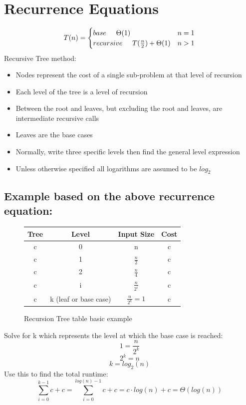 \documentclass[12pt,letterpaper]{article}
\begin{document}
\section{Recurrence Equations}
\[T(n)=\begin{cases}base \hspace{.5cm} \Theta(1) & n=1 \\ recursive \hspace{.5cm} T(\frac{n}{2})+\Theta(1) & n>1\end{cases}\]
Recursive Tree method:
\begin{itemize}
\item Nodes represent the cost of a single sub-problem at that level of recursion
\item Each level of the tree is a level of recursion
\item Between the root and leaves, but excluding the root and leaves, are intermediate recursive calls
\item Leaves are the base cases
\item Normally, write three specific levels then find the general level expression
\item Unless otherwise specified all logarithms are assumed to be $log_2$
\end{itemize}
\subsection{Example based on the above recurrence equation:}
\begin{figure}[h]
\centering
\begin{tabular}{|c|c|c|c|}
\hline
Tree & Level & Input Size & Cost\\
\hline
\hline
c & 0 & n & c\\
\hline
c & 1 & $\frac{n}{2}$ & c\\
\hline
c & 2 & $\frac{n}{4}$ & c\\
\hline
c & i & $\frac{n}{2^i}$ & c\\
\hline
c & k (leaf or base case) & $\frac{n}{2^k}=1$ & c\\
\hline
\end{tabular}
\caption{Recursion Tree table basic example}
\end{figure}  
Solve for k which represents the level at which the base case is reached:
\[ 1 = \frac{n}{2^k} \]
\[2^k=n\]
\[k=log_2 (n)\]
Use this to find the total runtime:
\[\sum_{i=0}^{k-1}c+c=\sum_{i=0}^{log(n)-1}c+c=c\cdot log(n)+ c = \Theta(log(n))\]
\end{document}
